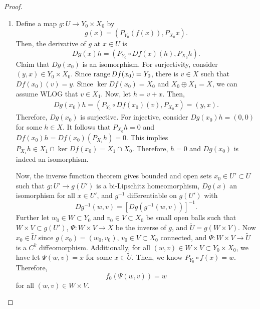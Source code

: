 \documentclass[a4paper]{article}
\begin{document}
\begin{proof}
  {
    \newcommand{\py}{{P_{Y_0}}}
    \newcommand{\pyy}{{P_{Y_1}}}
    \newcommand{\px}{{P_{X_0}}}
    \newcommand{\pxx}{{P_{X_1}}}
    \begin{enumerate}
      \item Define a map $g: U \to Y_0 \times X_0$ by
            \[
              g(x) = \left( P_{Y_0}(f(x)), P_{X_0}x \right).
            \]
            Then, the derivative of $g$ at $x \in U$ is
            \[
              Dg(x) h = (P_{Y_0} \circ Df(x) (h), P_{X_0} h).
            \]
            Claim that $Dg(x_0)$ is an isomorphism. For surjectivity,
            consider $(y, x) \in Y_0 \times X_0$. Since $\operatorname{range} Df(x_0) =
            Y_0$, there is $v \in X$ such that $Df(x_0) (v) = y$. Since
            $\ker Df(x_0) = X_0$ and $X_0 \oplus X_1 = X$, we can assume
            WLOG that $v \in X_1$. Now, let $h = v + x$. Then,
            \[
              \begin{aligned}
                Dg(x_0) h
                = (\py \circ Df(x_0) (v) , \px x)
                = (y, x).
              \end{aligned}
            \]
            Therefore, $Dg(x_0)$ is surjective. For injective, consider
            $Dg(x_0) h = (0, 0)$ for some $h \in X$. It follows that $\px
            h = 0$ and $Df(x_0) h = Df(x_0) (\pxx h) = 0$. This implies
            $\pxx h \in X_1 \cap \ker Df(x_0) = X_1 \cap X_0$. Therefore,
            $h = 0$ and $Dg(x_0)$ is indeed an isomorphism.

            Now, the inverse function theorem gives bounded and open sets
            $x_0 \in U' \subset U$ such that $g: U' \to g(U')$ is a
            bi-Lipschitz homeomorphism, $Dg(x)$ an isomorphism for all $x
            \in U'$, and $g^{-1}$ differentiable on $g(U')$ with
            \[
              Dg^{-1}(w, v) = [Dg(g^{-1}(w, v))]^{-1}.
            \]
            Further let $w_0 \in W \subset Y_0$ and $v_0 \in V \subset
            X_0$ be small open balls such that $W \times V \subset g(U')$,
            $\Psi: W \times V \to X$ be the inverse of $g$, and $\tilde{U}
            = g(W \times V)$. Now $x_0 \in \tilde{U}$ since $g(x_0) =
            (w_0, v_0)$, $v_0 \in V \subset X_0$ connected, and $\Psi : W
            \times V \to \tilde{U}$ is a $C^k$ diffeomorphism.
            Additionally, for all $(w, v) \in W \times V \subset Y_0
            \times X_0$, we have let $\Psi(w, v) = x$ for some $x \in
            \tilde{U}$. Then, we know $\py \circ f(x) = w$. Therefore,
            \[
              f_0(\Psi(w, v)) = w
            \]
            for all $(w, v) \in W \times V$.


\end{enumerate}}
\end{proof}
\end{document}
